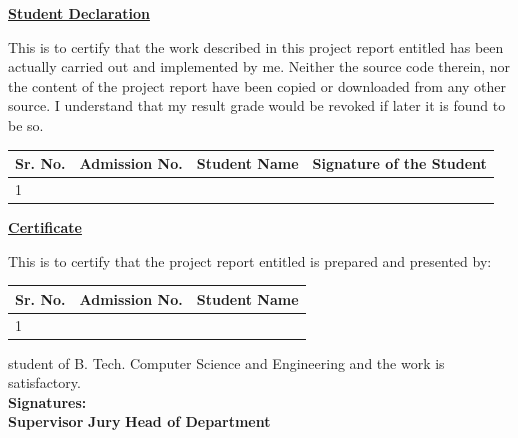 \newpage
{}
\begin{center}
	\textbf{\Huge \underline{Student Declaration}} \\[1.5cm]	
\end{center}

This is to certify that the work described in this project report entitled \textbf{\ProjectTitle} has been actually carried out and implemented by me. Neither the source code therein, nor the content of the project report have been copied or downloaded from any other source. I understand that my result grade would be revoked if later it is found to be so. 

\begin{center}
	\renewcommand{\arraystretch}{1.5}
	\begin{tabular}{|C{.05\textwidth}|C{.15\textwidth}|C{.5\textwidth}|C{.2\textwidth}|}
		\hline
		\textbf{Sr. No.} & \textbf{Admission No.} & \textbf{Student Name} & \textbf{Signature of the Student} \\
		 & \AdmissionNumberA & \StudentNameA &  \\
		\hline
	\end{tabular}
\end{center}

\newpage
\begin{center}
	\textbf{\Huge \underline{Certificate}} \\[1.5cm]	
\end{center}

This is to certify that the project report entitled \textbf{\ProjectTitle} is prepared and presented by:

\begin{center}
	\renewcommand{\arraystretch}{1.5}
	\begin{tabular}{|C{.05\textwidth}|C{.25\textwidth}|C{.6\textwidth}|}
		\hline
		\textbf{Sr. No.} & \textbf{Admission No.} & \textbf{Student Name} \\
		 & \AdmissionNumberA & \StudentNameA  \\
		\hline
	\end{tabular}
\end{center}

student of B. Tech. Computer Science and Engineering and the work is satisfactory. \\[2cm]

\textbf{Signatures:} \\[2cm]
\textbf{Supervisor} \hfill \textbf{Jury} \hfill \textbf{Head of Department}



